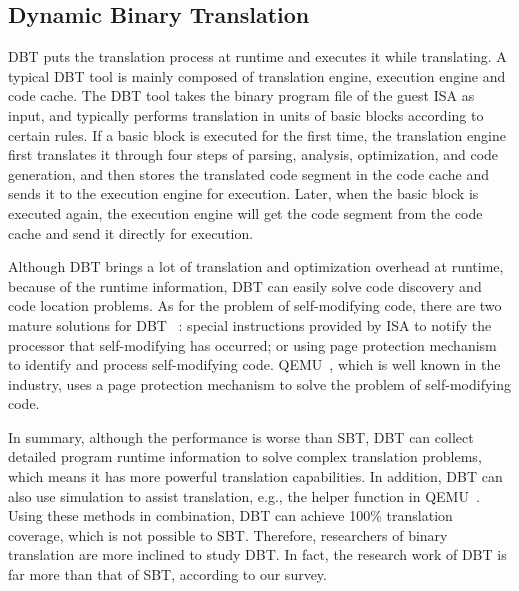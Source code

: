 \subsection{Dynamic Binary Translation}
DBT puts the translation process at runtime and executes it while translating. 
A typical DBT tool is mainly composed of translation engine, execution engine and code cache. 
The DBT tool takes the binary program file of the guest ISA as input, and typically performs translation in units of basic blocks according to certain rules. 
If a basic block is executed for the first time, the translation engine first translates it through four steps of parsing, analysis, optimization, and code generation, and then stores the translated code segment in the code cache and sends it to the execution engine for execution. 
Later, when the basic block is executed again, the execution engine will get the code segment from the code cache and send it directly for execution.

Although DBT brings a lot of translation and optimization overhead at runtime, because of the runtime information, DBT can easily solve code discovery and code location problems. 
As for the problem of self-modifying code, there are two mature solutions for DBT ~\cite{probst2002dynamic}: special instructions provided by ISA to notify the processor that self-modifying has occurred; or using page protection mechanism to identify and process self-modifying code. 
QEMU~\cite{DBLP:conf/usenix/Bellard05}, which is well known in the industry, uses a page protection mechanism to solve the problem of self-modifying code.

In summary, although the performance is worse than SBT, DBT can collect detailed program runtime information to solve complex translation problems, which means it has more powerful translation capabilities.
In addition, DBT can also use simulation to assist translation, e.g., the helper function in QEMU~\cite{DBLP:conf/usenix/Bellard05}.
Using these methods in combination, DBT can achieve 100\% translation coverage, which is not possible to SBT.
Therefore, researchers of binary translation are more inclined to study DBT.
In fact, the research work of DBT is far more than that of SBT, according to our survey.
